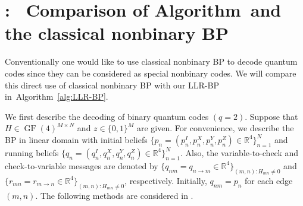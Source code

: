 \documentclass{ieeeaccess}
\DeclareMathOperator{\GF}{GF}
\newcommand{\RR}{{\mathbb R}}
\theoremstyle{definition}		%
\begin{document}
\section{:~ Comparison of Algorithm~\protect{} and the classical nonbinary BP} \label{sec:CBP}	%


Conventionally one would like to use classical nonbinary BP to decode quantum codes since they can be considered as special nonbinary codes.
We will compare this direct use of classical nonbinary BP with our LLR-BP in~Algorithm~\ref{alg:LLR-BP}.

We first describe the decoding of binary quantum codes ${ (q=2) }$. 
%
Suppose that ${ H\in\GF(4)^{M\times N} }$ and ${ z\in\{0,1\}^M }$ are given.
For convenience, we describe the BP  in linear domain with  
initial beliefs ${ \{p_n=(p_n^I,p_n^X,p_n^Y,p_n^Z)\in\RR^4\}_{n=1}^{N} }$ and 
running beliefs ${ \{q_n=(q_n^I,q_n^X,q_n^Y,q_n^Z)\in\RR^4\}_{n=1}^{N} }$.
Also, the variable-to-check and check-to-variable messages are denoted by 
${ \{q_{nm} = q_{n\to m}\in\RR^4\}_{(m,n):H_{mn}\ne0} }$ and 
${ \{r_{mn} = r_{m\to n}\in\RR^4\}_{(m,n):H_{mn}\ne0} }$, respectively.
Initially,  $q_{nm} = p_n$ for each edge $(m,n)$. 
%
The following methods are considered in \cite{Wan+12,Bab+15}.
\end{document}
